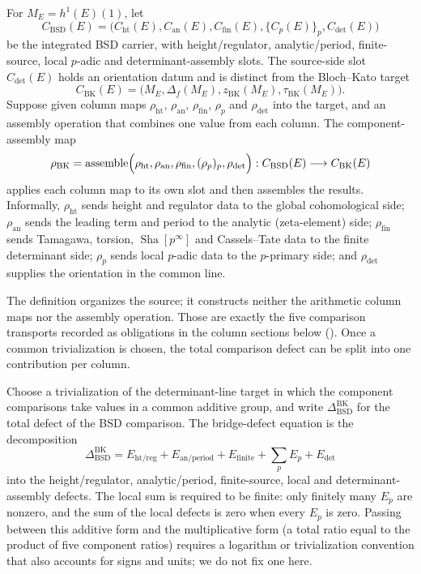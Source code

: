 \documentclass[11pt]{article}
\theoremstyle{definition}
\newcommand{\Sha}{\operatorname{Sha}}
\begin{document}
\begin{definition}
\label{def:apparatus:bk-component-map}
For $M_E=h^1(E)(1)$, let
\[
  C_{\mathrm{BSD}}(E)
  =
  \bigl(C_{\mathrm{ht}}(E),C_{\mathrm{an}}(E),C_{\mathrm{fin}}(E),
  \{C_p(E)\}_p,C_{\det}(E)\bigr)
\]
be the integrated BSD carrier, with height/regulator, analytic/period,
finite-source, local $p$-adic and determinant-assembly slots.  The
source-side slot $C_{\det}(E)$ holds an orientation datum and is distinct
from the Bloch--Kato target
\[
  C_{\mathrm{BK}}(E)
  =
  \bigl(M_E,\Delta_f(M_E),z_{\mathrm{BK}}(M_E),\tau_{\mathrm{BK}}(M_E)\bigr).
\]
Suppose given column maps $\rho_{\mathrm{ht}}$, $\rho_{\mathrm{an}}$,
$\rho_{\mathrm{fin}}$, $\rho_p$ and $\rho_{\det}$ into the target, and an
assembly operation that combines one value from each column.  The
component-assembly map
\[
  \rho_{\mathrm{BK}}
  =
  \operatorname{assemble}\Bigl(
  \rho_{\mathrm{ht}},\rho_{\mathrm{an}},\rho_{\mathrm{fin}},
  (\rho_p)_p,\rho_{\det}\Bigr)
  :
  C_{\mathrm{BSD}}(E)\longrightarrow C_{\mathrm{BK}}(E)
\]
applies each column map to its own slot and then assembles the results.
Informally, $\rho_{\mathrm{ht}}$ sends height and regulator data to the
global cohomological side; $\rho_{\mathrm{an}}$ sends the leading term and
period to the analytic (zeta-element) side; $\rho_{\mathrm{fin}}$ sends
Tamagawa, torsion, $\Sha[p^\infty]$ and Cassels--Tate data to the finite
determinant side; $\rho_p$ sends local $p$-adic data to the $p$-primary
side; and $\rho_{\det}$ supplies the orientation in the common line.
\end{definition}

The definition organizes the source; it constructs neither the arithmetic
column maps nor the assembly operation.  Those are exactly the five
comparison transports recorded as obligations in the column sections below
().
Once a common trivialization is chosen, the total comparison defect can be
split into one contribution per column.

\begin{definition}
\label{def:apparatus:bridge-defect-equation}
Choose a trivialization of the determinant-line target in which the
component comparisons take values in a common additive group, and write
$\Delta_{\mathrm{BSD}}^{\mathrm{BK}}$ for the total defect of the BSD
comparison.  The bridge-defect equation is the decomposition
\[
  \Delta_{\mathrm{BSD}}^{\mathrm{BK}}
  =
  E_{\mathrm{ht/reg}}
  +E_{\mathrm{an/period}}
  +E_{\mathrm{finite}}
  +\sum_p E_p
  +E_{\det}
\]
into the height/regulator, analytic/period, finite-source, local and
determinant-assembly defects.  The local sum is required to be finite:
only finitely many $E_p$ are nonzero, and the sum of the local defects is
zero when every $E_p$ is zero.  Passing between this additive form and
the multiplicative form (a total ratio equal to the product of five
component ratios) requires a logarithm or trivialization convention that
also accounts for signs and units; we do not fix one here.
\end{definition}
\end{document}
